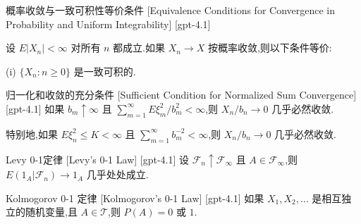 \documentclass[UTF8]{ctexart}
\begin{document}
    
    
    \begin{thm}
        {概率收敛与一致可积性等价条件}
        [Equivalence Conditions for Convergence in Probability and Uniform Integrability]
        [gpt-4.1]
        
设 $E | X_n | < \infty$ 对所有 $n$ 都成立.如果 $X_n \to X$ 按概率收敛,则以下条件等价:

(i) $\{ X_n : n \geq 0 \}$ 是一致可积的.

    \end{thm}
    
    
    
    \begin{thm}
        {归一化和收敛的充分条件}
        [Sufficient Condition for Normalized Sum Convergence]
        [gpt-4.1]
        如果 $b_{m} \uparrow \infty$ 且 $\sum_{m=1}^{\infty} E \xi_{m}^{2} / b_{m}^{2} < \infty$,则 $X_{n} / b_{n} \to 0$ 几乎必然收敛.

特别地,如果 $E \xi_{n}^{2} \le K < \infty$ 且 $\sum_{m=1}^{\infty} b_{m}^{-2} < \infty$,则 $X_{n} / b_{n} \to 0$ 几乎必然收敛.

    \end{thm}
    
    
    
    \begin{thm}
        {Levy 0-1定律}
        [Levy's 0-1 Law]
        [gpt-4.1]
        设 $\mathcal{F}_{n} \uparrow \mathcal{F}_{\infty}$ 且 $A \in {\mathcal{F}}_{\infty}$,则 $E(1_{A}|\mathcal{F}_{n}) \to 1_{A}$ 几乎处处成立.
    \end{thm}
    
    
    
    \begin{thm}
        {Kolmogorov 0-1 定律}
        [Kolmogorov's 0-1 Law]
        [gpt-4.1]
        如果 $X_1, X_2, \dots$ 是相互独立的随机变量,且 $A \in \mathcal{T}$,则 $P(A) = 0$ 或 $1$.
    \end{thm}
    
    
    
\end{document}
